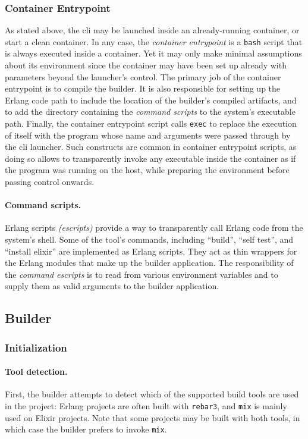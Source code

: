 \subsubsection{Container Entrypoint}

As stated above, the \acrshort{cli} may be launched inside an already-running container, or start a clean container. In any case, the \emph{container entrypoint} is a \lstinline|bash| script that is always executed inside a container. Yet it may only make minimal assumptions about its environment since the container may have been set up already with parameters beyond the launcher's control. The primary job of the container entrypoint is to compile the builder. It is also responsible for setting up the Erlang code path to include the location of the builder's compiled artifacts, and to add the directory containing the \emph{command scripts} to the system's executable path. Finally, the container entrypoint script calls \lstinline|exec| to replace the execution of itself with the program whose name and arguments were passed through by the \acrshort{cli} launcher. Such constructs are common in container entrypoint scripts, as doing so allows to transparently invoke any executable inside the container as if the program was running on the host, while preparing the environment before passing control onwards.

\paragraph{Command scripts.} Erlang scripts \emph{(escripts)} provide a way to transparently call Erlang code from the system's shell. Some of the tool's commands, including ``build'', ``self test'', and ``install elixir'' are implemented as Erlang scripts. They act as thin wrappers for the Erlang modules that make up the builder application. The responsibility of the \emph{command escripts} is to read from various environment variables and to supply them as valid arguments to the builder application.

\cleardoublepage
\subsection{Builder}

\subsubsection{Initialization}
\paragraph{Tool detection.} First, the builder attempts to detect which of the supported build tools are used in the project: Erlang projects are often built with \lstinline|rebar3|, and \lstinline|mix| is mainly used on Elixir projects. Note that some projects may be built with both tools, in which case the builder prefers to invoke \lstinline|mix|.

